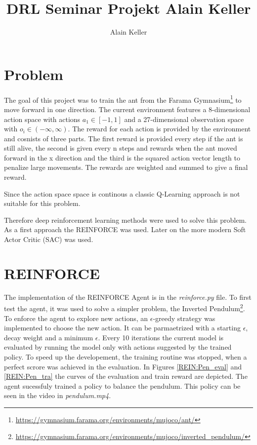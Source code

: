 \documentclass[11pt, a4paper]{article}
\title{DRL Seminar Projekt Alain Keller}
\author{Alain Keller}
\begin{document}
\maketitle
\section{Problem}
The goal of this project was to train the ant from the Farama Gymnasium\footnote{\url{https://gymnasium.farama.org/environments/mujoco/ant/}} to move forward in one direction.
The current environment features a 8-dimensional action space with actions $a_1 \in [-1,1]$ and 
a 27-dimensional observation space with $o_i \in (-\infty, \infty)$.
The reward for each action is provided by the environment and cosnists of three parts.
The first reward is provided every step if the ant is still alive, the second is given every n steps and 
rewards when the ant moved forward in the x direction and the third is the squared action vector length to penalize large movements.
The rewards are weighted and summed to give a final reward.

Since the action space space is continous a classic Q-Learning approach is not suitable for this problem.

Therefore deep reinforcement learning methods were used to solve this problem.
As a first approach the REINFORCE \cite{REINFORCE} was used.
Later on the more modern Soft Actor Critic (SAC) \cite{haarnoja2018soft} was used.
\section{REINFORCE}
The implementation of the REINFORCE Agent is in the \textit{reinforce.py} file.
To first test the agent, it was used to solve a simpler problem, the Inverted Pendulum\footnote{\url{https://gymnasium.farama.org/environments/mujoco/inverted_pendulum/}}.
To enforce the agent to explore new actions, an $\epsilon$-greedy strategy was implemented to choose
the new action. It can be parmaetrized with a starting $\epsilon$, decay weight and a minimum $\epsilon$.
Every 10 iterations the current model is evaluated by running the model only with actions suggested by the trained policy.
To speed up the developement, the training routine was stopped, when a perfect scrore was achieved in the evaluation.
In Figures \ref{REIN:Pen_eval} and \ref{REIN:Pen_tra} the curves of the evaluation and train reward are depicted.
The agent sucessfuly trained a policy to balance the pendulum. This policy can be seen in the video in \textit{pendulum.mp4}.
\end{document}
